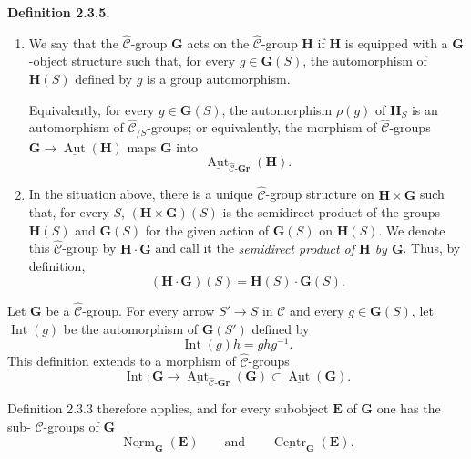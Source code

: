 \medskip
\noindent\textbf{Definition 2.3.5.}
\begin{enumerate}
  \item[(a)]
  We say that the \(\widehat{\mathscr C}\)-group \(\mathbf G\) acts on
  the \(\widehat{\mathscr C}\)-group \(\mathbf H\) if \(\mathbf H\)
  is equipped with a \(\mathbf G\)-object structure such that, for
  every \(g\in\mathbf G(S)\), the automorphism of \(\mathbf H(S)\)
  defined by \(g\) is a group automorphism.

  Equivalently, for every \(g\in\mathbf G(S)\), the automorphism
  \(\rho(g)\) of \(\mathbf H_S\) is an automorphism of
  \(\widehat{\mathscr C}_{/S}\)-groups; or equivalently, the morphism of
  \(\widehat{\mathscr C}\)-groups
  \(\mathbf G\to\underline{\operatorname{Aut}}(\mathbf H)\) maps
  \(\mathbf G\) into
  \[
    \underline{\operatorname{Aut}}_{
      \widehat{\mathscr C}\text{-}\mathbf{Gr}}(\mathbf H).
  \]

  \item[(b)]
  In the situation above, there is a unique
  \(\widehat{\mathscr C}\)-group structure on
  \(\mathbf H\times\mathbf G\) such that, for every \(S\),
  \((\mathbf H\times\mathbf G)(S)\) is the semidirect product of the
  groups \(\mathbf H(S)\) and \(\mathbf G(S)\) for the given action of
  \(\mathbf G(S)\) on \(\mathbf H(S)\). We denote this
  \(\widehat{\mathscr C}\)-group by \(\mathbf H\mathbin{\cdot}\mathbf G\)
  and call it the \emph{semidirect product of \(\mathbf H\) by
  \(\mathbf G\)}. Thus, by definition,
  \[
    (\mathbf H\mathbin{\cdot}\mathbf G)(S)
      =\mathbf H(S)\mathbin{\cdot}\mathbf G(S).
  \]
\end{enumerate}

Let \(\mathbf G\) be a \(\widehat{\mathscr C}\)-group. For every arrow
\(S'\to S\) in \(\mathscr C\) and every \(g\in\mathbf G(S)\), let
\(\operatorname{Int}(g)\) be the automorphism of \(\mathbf G(S')\)
defined by
\[
  \operatorname{Int}(g)h=ghg^{-1}.
\]
This definition extends to a morphism of
\(\widehat{\mathscr C}\)-groups
\[
  \operatorname{Int}:\mathbf G\longrightarrow
  \underline{\operatorname{Aut}}_{
    \widehat{\mathscr C}\text{-}\mathbf{Gr}}(\mathbf G)
  \subset
  \underline{\operatorname{Aut}}(\mathbf G).
\]

Definition 2.3.3 therefore applies, and for every subobject
\(\mathbf E\) of \(\mathbf G\) one has the sub-
\(\widehat{\mathscr C}\)-groups of \(\mathbf G\)
\[
  \underline{\operatorname{Norm}}_{\mathbf G}(\mathbf E)
  \qquad\text{and}\qquad
  \underline{\operatorname{Centr}}_{\mathbf G}(\mathbf E).
\]

